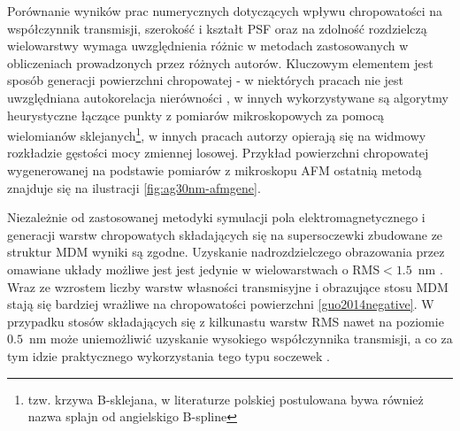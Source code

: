 Porównanie wyników prac numerycznych dotyczących wpływu chropowatości na współczynnik transmisji, szerokość i kształt PSF oraz na zdolność rozdzielczą wielowarstwy wymaga uwzględnienia różnic w metodach zastosowanych w obliczeniach prowadzonych przez różnych autorów. Kluczowym elementem jest sposób generacji powierzchni chropowatej - w niektórych pracach nie jest uwzględniana autokorelacja nierówności \cite{guo2014negative}, w innych wykorzystywane są algorytmy heurystyczne łączące punkty z pomiarów mikroskopowych za pomocą wielomianów sklejanych\footnote{tzw. krzywa B-sklejana, w literaturze polskiej postulowana bywa również nazwa splajn od angielskigo B-spline}\cite{ludwig2012impact}, w innych pracach autorzy opierają się na widmowy rozkładzie gęstości mocy zmiennej losowej\cite{pastuszczak2013engineering}. Przykład powierzchni chropowatej wygenerowanej na podstawie pomiarów z mikroskopu AFM ostatnią metodą znajduje się na ilustracji \ref{fig:ag30nm-afmgene}.

Niezależnie od zastosowanej metodyki symulacji pola elektromagnetycznego i generacji warstw chropowatych składających się na supersoczewki zbudowane ze struktur MDM wyniki są zgodne. Uzyskanie nadrozdzielczego obrazowania przez omawiane układy  możliwe jest jest jedynie w wielowarstwach o RMS$<1.5$~nm \citep{guo2014negative,stefaniuk2011effect,ludwig2012impact}. Wraz ze wzrostem liczby warstw własności transmisyjne i obrazujące stosu MDM stają się bardziej wrażliwe na chropowatości powierzchni \ref{guo2014negative}. W przypadku stosów składających się z kilkunastu warstw RMS nawet na poziomie $0.5$~nm może uniemożliwić uzyskanie wysokiego współczynnika transmisji, a co za tym idzie praktycznego wykorzystania tego typu soczewek \cite{pastuszczak2013engineering}.








